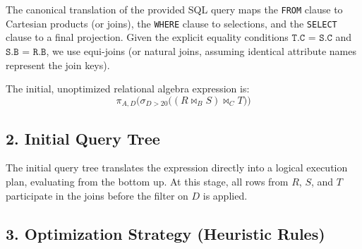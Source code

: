 \documentclass[12pt,a3paper]{article}
\begin{document}
\begin{enumerate}
\begin{tcolorbox}[enhanced,breakable,ansbox,colback=cD!4,colframe=cD,boxrule=0.8pt,arc=5pt,title={\textbf{Answer}},fonttitle=\bfseries\color{white},colbacktitle=cD]
The canonical translation of the provided SQL query maps the \texttt{FROM} clause to Cartesian products (or joins), the \texttt{WHERE} clause to selections, and the \texttt{SELECT} clause to a final projection. Given the explicit equality conditions $\texttt{T.C = S.C}$ and $\texttt{S.B = R.B}$, we use equi-joins (or natural joins, assuming identical attribute names represent the join keys). 

The initial, unoptimized relational algebra expression is:
\begin{equation*}
    \pi_{A, D} \Big( \sigma_{D > 20} \big( (R \bowtie_{B} S) \bowtie_{C} T \big) \Big)
\end{equation*}

\subsection*{2. Initial Query Tree}

The initial query tree translates the expression directly into a logical execution plan, evaluating from the bottom up. At this stage, all rows from $R$, $S$, and $T$ participate in the joins before the filter on $D$ is applied.

\vspace{1em}
\begin{center}
\end{center}
\vspace{1em}

\subsection*{3. Optimization Strategy (Heuristic Rules)}


\end{tcolorbox}
\end{enumerate}
\end{document}
